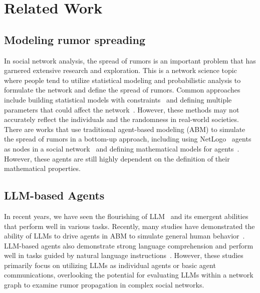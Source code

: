 \vspace{-0.02cm}
\section{Related Work}
\label{sec:related_work}

\subsection{Modeling rumor spreading} 
In social network analysis, the spread of rumors is an important problem that has garnered extensive research and exploration. 
This is a network science topic where people tend to utilize statistical modeling and probabilistic analysis to formulate the network and define the spread of rumors. 
Common approaches include building statistical models with constraints~\cite{zehmakan2023rumorsspreadfastsocial} and defining multiple parameters that could affect the network~\cite{chen2020rumor}. 
However, these methods may not accurately reflect the individuals and the randomness in real-world societies.
There are works that use traditional agent-based modeling (ABM) to simulate the spread of rumors in a bottom-up approach, including using NetLogo~\cite{wilensky1999netlogo} agents as nodes in a social network~\cite{kaligotla2015agent} and defining mathematical models for agents~\cite{zehmakan2023rumorsspreadfastsocial}. 
However, these agents are still highly dependent on the definition of their mathematical properties.

\subsection{LLM-based Agents} 
In recent years, we have seen the flourishing of LLM~\cite{openai2024chatgpt} and its emergent abilities that perform well in various tasks. 
Recently, many studies have demonstrated the ability of LLMs to drive agents in ABM to simulate general human behavior~\cite{park2023Generate, chuang2024simulatingopiniondynamicsnetworks}.
LLM-based agents also demonstrate strong language comprehension and perform well in tasks guided by natural language instructions~\cite{chen2024scalablemultirobotcollaborationlarge}.
However, these studies primarily focus on utilizing LLMs as individual agents or basic agent communications, overlooking the potential for evaluating LLMs within a network graph to examine rumor propagation in complex social networks.


